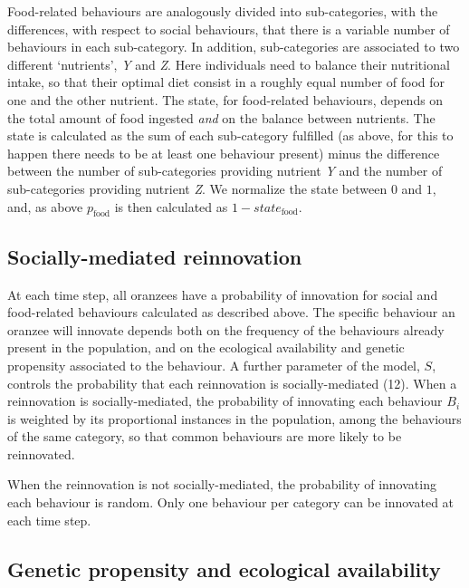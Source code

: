 \documentclass[9pt,twocolumn,twoside,]{pnas-new}
\begin{document}
Food-related behaviours are analogously divided into sub-categories,
with the differences, with respect to social behaviours, that there is a
variable number of behaviours in each sub-category. In addition,
sub-categories are associated to two different `nutrients', \emph{Y} and
\emph{Z}. Here individuals need to balance their nutritional intake, so
that their optimal diet consist in a roughly equal number of food for
one and the other nutrient. The state, for food-related behaviours,
depends on the total amount of food ingested \emph{and} on the balance
between nutrients. The state is calculated as the sum of each
sub-category fulfilled (as above, for this to happen there needs to be
at least one behaviour present) minus the difference between the number
of sub-categories providing nutrient \emph{Y} and the number of
sub-categories providing nutrient \emph{Z}. We normalize the state
between \(0\) and \(1\), and, as above \(p_\text{food}\) is then
calculated as \(1-state_\text{food}\).

\subsection*{Socially-mediated reinnovation}\label{format}

At each time step, all oranzees have a probability of innovation for
social and food-related behaviours calculated as described above. The
specific behaviour an oranzee will innovate depends both on the
frequency of the behaviours already present in the population, and on
the ecological availability and genetic propensity associated to the
behaviour. A further parameter of the model, \(S\), controls the
probability that each reinnovation is socially-mediated (12). When a
reinnovation is socially-mediated, the probability of innovating each
behaviour \(B_i\) is weighted by its proportional instances in the
population, among the behaviours of the same category, so that common
behaviours are more likely to be reinnovated.

When the reinnovation is not socially-mediated, the probability of
innovating each behaviour is random. Only one behaviour per category can
be innovated at each time step.

\subsection*{Genetic propensity and ecological
availability}\label{format}
\end{document}
